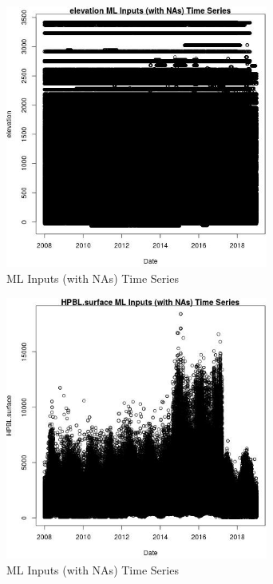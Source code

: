 \begin{figure} 
\centering  
\includegraphics[width=0.77\textwidth]{Code_Outputs/Report_ML_input_PM25_Step4_part_f_de_duplicated_aves_prioritize_24hr_obswNAs_elevationvDate.jpg} 
\caption{\label{fig:Report_ML_input_PM25_Step4_part_f_de_duplicated_aves_prioritize_24hr_obswNAselevationvDate}ML Inputs (with NAs) Time Series} 
\end{figure} 
 

\begin{figure} 
\centering  
\includegraphics[width=0.77\textwidth]{Code_Outputs/Report_ML_input_PM25_Step4_part_f_de_duplicated_aves_prioritize_24hr_obswNAs_HPBLsurfacevDate.jpg} 
\caption{\label{fig:Report_ML_input_PM25_Step4_part_f_de_duplicated_aves_prioritize_24hr_obswNAsHPBLsurfacevDate}ML Inputs (with NAs) Time Series} 
\end{figure} 
 


